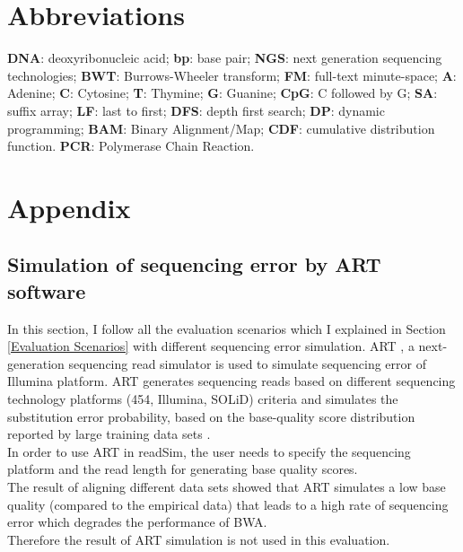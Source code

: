 \documentclass[11pt,a4paper]{report}
\begin{document}

\section{Abbreviations} \label{Abbreviations}

\textbf{DNA}: deoxyribonucleic acid;
\textbf{bp}: base pair;
\textbf{NGS}: next generation sequencing technologies;
\textbf{BWT}: Burrows-Wheeler transform;
\textbf{FM}: full-text minute-space;
\textbf{A}: Adenine;
\textbf{C}: Cytosine;
\textbf{T}: Thymine;
\textbf{G}: Guanine;
\textbf{CpG}: C followed by G;
\textbf{SA}: suffix array;
\textbf{LF}: last to first;
\textbf{DFS}: depth first search;
\textbf{DP}: dynamic programming;
\textbf{BAM}: Binary Alignment/Map;
\textbf{CDF}: cumulative distribution function.
\textbf{PCR}: Polymerase Chain Reaction.




\newpage
\appendix
\section*{Appendix}
\renewcommand{\thesubsection}{\Alph{subsection}}

\subsection{Simulation of sequencing error by ART software} 
\label{Simulation sequencing error by ART software}

In this section, I follow all the evaluation scenarios which I explained in
Section \ref{Evaluation Scenarios}  with different sequencing error simulation.
ART \cite{art}, a next-generation sequencing read simulator is used to simulate sequencing
error of Illumina platform. 
ART generates sequencing reads based on different sequencing technology 
platforms (454, Illumina, SOLiD) criteria \cite{art} and simulates the
substitution error probability, based on the base-quality 
score distribution reported by large training data sets \cite{art}.\\

In order to use ART in readSim, the user needs to specify the sequencing
platform and the read length for generating base quality scores.\\

The result of aligning different data sets showed that ART simulates a
low base quality (compared to the empirical data) that leads to 
a high rate of sequencing error which degrades the performance of BWA.\\
Therefore the result of ART simulation is not used in this evaluation. \\
\end{document}
